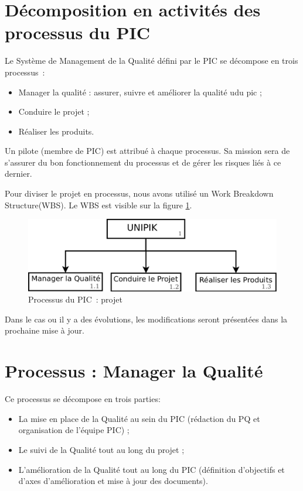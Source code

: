 \section{Décomposition en activités des processus du PIC}

Le Système de Management de la Qualité défini par le PIC \nomPIC{} se décompose en trois processus~:
\begin{itemize}
 \item Manager la qualité : assurer, suivre et améliorer la qualité udu pic ; 
 \item Conduire le projet ;
 \item Réaliser les produits. \\
\end{itemize}

Un pilote (membre de PIC) est attribué à chaque processus. Sa mission sera de s'assurer du bon fonctionnement du processus et de gérer les risques liés à ce dernier.

Pour diviser le projet en processus, nous avons utilisé un Work Breakdown Structure(WBS). Le WBS est visible sur la figure \ref{WBS1}.

\begin{figure}[H]
\centering
 \includegraphics[width=14cm]{images/organigrammeProcessusPic.png}
 \caption{Processus du PIC~: projet \nomEquipe{}}
 \label{WBS1}
\end{figure}

 Dans le cas ou il y a des évolutions, les modifications seront présentées dans la prochaine mise à jour.
\newpage
 
\section{Processus : Manager la Qualité}
\label{ProcessusQualite}
Ce processus se décompose en trois parties:
\begin{itemize}
\item La mise en place de la Qualité au sein du PIC (rédaction du PQ et organisation de l'équipe PIC) ; 
\item Le suivi de la Qualité tout au long du projet ; 
\item L'amélioration de la Qualité tout au long du PIC (définition d'objectifs et d'axes d'amélioration et mise à jour des documents). 
\end{itemize}
